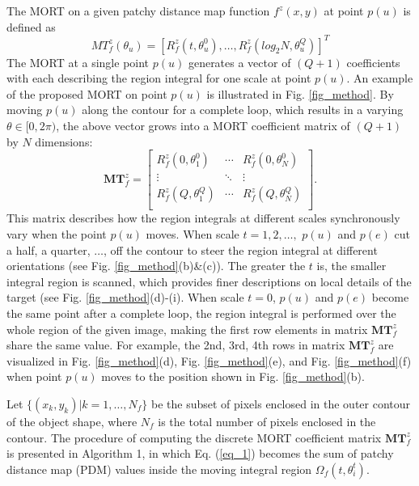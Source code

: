\documentclass[letterpaper]{article} %
\begin{document}
The MORT on a given patchy distance map function $f^z (x,y)$ at point $p(u)$ is defined as
\begin{equation}
MT_f^z(\theta_u) =  [R_f^z (t,\theta_u^0) ,\dots, R_f^z (log_2 N,\theta_u^Q)]^T
\label{eq_3}
\end{equation}
The MORT at a single point $p(u)$ generates a vector of $(Q+1)$ coefficients with each describing the region integral for one scale at point $p(u)$. An example of the proposed MORT on point $p(u)$ is illustrated in Fig. \ref{fig_method}. By moving $p(u)$ along the contour for a complete loop, which results in a varying $\theta\in[0,2\pi)$, the above vector grows into a MORT coefficient matrix of $(Q+1)$ by $N$ dimensions:
\begin{equation}
\boldsymbol{MT}_f^z  = \left[
\begin{matrix}
R_f^z (0,\theta_1^0)    & \cdots & R_f^z (0,\theta_N^0)      \\
 \vdots  & \ddots & \vdots \\
 R_f^z (Q,\theta_1^Q)     & \cdots & R_f^z (Q,\theta_N^Q)     \\
\end{matrix}
\right].
\label{eq_4}
\end{equation}
This matrix describes how the region integrals at different scales synchronously vary when the point $p(u)$ moves. When scale $t=1,2,\dots,$ $p(u)$ and $p(e)$ cut a half, a quarter, $\dots$, off the contour to steer the region integral at different orientations (see Fig. \ref{fig_method}(b)\&(c)). The greater the $t$ is, the smaller integral region is scanned, which provides finer descriptions on local details of the target (see Fig. \ref{fig_method}(d)-(i). When scale $t=0$, $p(u)$ and $p(e)$ become the same point after a complete loop, the region integral is performed over the whole region of the given image, making the first row elements in matrix $\boldsymbol{MT}_f^z$ share the same value. For example, the 2nd, 3rd, 4th rows in matrix $\boldsymbol{MT}_f^z$  are visualized in Fig. \ref{fig_method}(d), Fig. \ref{fig_method}(e), and Fig. \ref{fig_method}(f) when point $p(u)$ moves to the position shown in Fig. \ref{fig_method}(b).

Let $\{(x_k,y_k ) | k=1,\dots,N_f\}$ be the subset of pixels enclosed in the outer contour of the object shape, where $N_f$ is the total number of pixels enclosed in the contour. The procedure of computing the discrete MORT coefficient matrix $\boldsymbol{MT}_f^z$  is presented in Algorithm 1, in which Eq. (\ref{eq_1}) becomes the sum of patchy distance map (PDM) values inside the moving integral region $\Omega_f (t,\theta_i^t )$.
\end{document}
